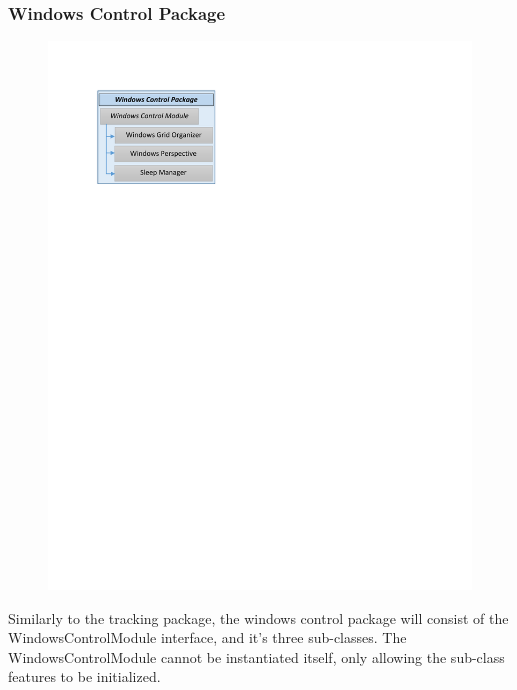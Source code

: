 \documentclass[titlepage]{article}
\begin{document}
\subsubsection{Windows Control Package}
\begin{minipage}{\textwidth}
\begin{figure}
  \vspace{-20pt}
  \begin{center}
	\includegraphics{windows_control_package.pdf}
  \end{center}
\end{figure}
Similarly to the tracking package, the windows control package will consist of the WindowsControlModule interface, and it's three sub-classes. The WindowsControlModule cannot be instantiated itself, only allowing the sub-class features to be initialized.
\end{minipage}

\vspace{+100pt}
\end{document}
